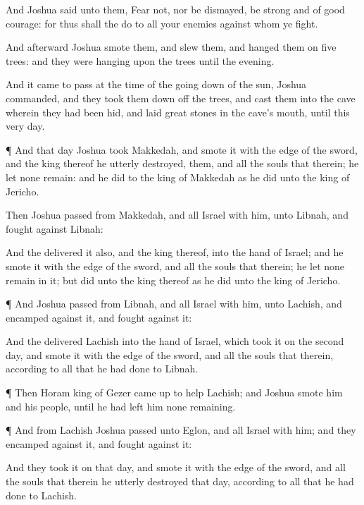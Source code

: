 {And
Joshua
said unto them,
Fear not, nor be
dismayed, be
strong and of good
courage: for thus shall the
{}
do to all your
enemies against whom ye
fight.

And
afterward
Joshua
smote them, and
slew them, and
hanged them on
five
trees: and they were
hanging upon the
trees until the
evening.

And it came to pass at the
time of the going
down of the
sun,
{}
Joshua
commanded, and they took them
down off the
trees, and
cast them into the
cave wherein they had been
hid, and
laid
great
stones in the
cave’s
mouth,
{} until this
very
day.


\par }{\PP {}¶ And that
day
Joshua
took
Makkedah, and
smote it with the
edge of the
sword, and the
king thereof he utterly
destroyed, them, and all the
souls that
{} therein; he
let none
remain: and he
did to the
king of
Makkedah as he
did unto the
king of
Jericho.

Then
Joshua
passed from
Makkedah, and all
Israel with him, unto
Libnah, and
fought against
Libnah:

And the
{}
delivered it also, and the
king thereof, into the
hand of
Israel; and he
smote it with the
edge of the
sword, and all the
souls that
{} therein; he
let none
remain in it; but
did unto the
king thereof as he
did unto the
king of
Jericho.


\par }{\PP {}¶ And
Joshua
passed from
Libnah, and all
Israel with him, unto
Lachish, and
encamped against it, and
fought against it:

And the
{}
delivered
Lachish into the
hand of
Israel, which
took it on the
second
day, and
smote it with the
edge of the
sword, and all the
souls that
{} therein, according to all that he had
done to
Libnah.


\par }{\PP {}¶ Then
Horam
king of
Gezer came
up to
help
Lachish; and
Joshua
smote him and his
people, until he had
left him none
remaining.


\par }{\PP {}¶ And from
Lachish
Joshua
passed unto
Eglon, and all
Israel with him; and they
encamped against it, and
fought against it:

And they
took it on that
day, and
smote it with the
edge of the
sword, and all the
souls that
{} therein he utterly
destroyed that
day, according to all that he had
done to
Lachish.

}
